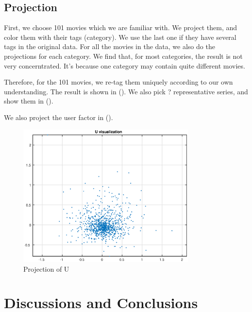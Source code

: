 \documentclass[12pt]{article}
\begin{document}
\subsection{Projection}
First, we choose 101 movies which we are familiar with. We project them, and color them with their tags (category). We use the last one if they have several tags in the original data. For all the movies in the data, we also do the projections for each category. We find that, for most categories, the result is not very concerntrated. It's because one category may contain quite different movies.

Therefore, for the 101 movies, we re-tag them uniquely according to our own understanding. The result is shown in (). We also pick ? representative series, and show them in (). 

We also project the user factor in ().
\begin{figure}[h!]
  \centering
      \includegraphics[width=0.8\textwidth]{U}
  \caption{Projection of U}
  \label{fig:U}
\end{figure}

\section{Discussions and Conclusions}
\end{document}
